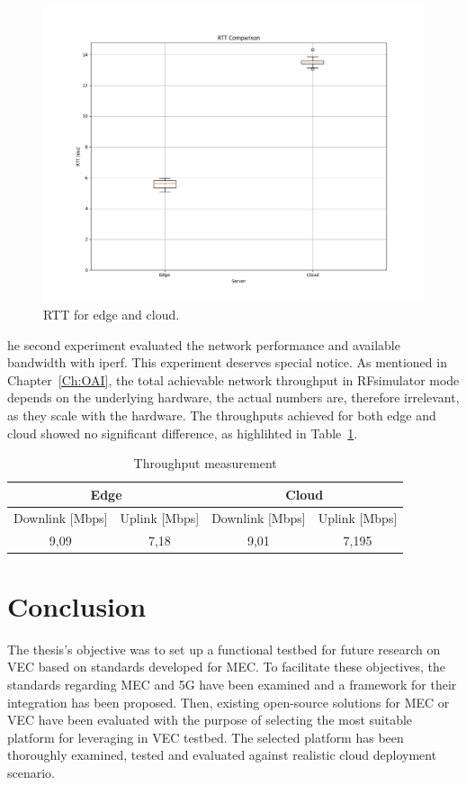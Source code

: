 \documentclass[12pt,a4paper,twoside]{report}
\begin{document}
\begin{figure}[ht]
	\centering
	\captionsetup{labelsep=colon,name=Graph}
	\includegraphics[width=13cm]{./images/RTT_comp_box.png} 
	\caption{RTT for edge and cloud.}
\end{figure}
%
he second experiment evaluated the network performance and available bandwidth with iperf. This experiment deserves special notice. As mentioned in Chapter~\ref{Ch:OAI}, the total achievable network throughput in RFsimulator mode depends on the underlying hardware, the actual numbers are, therefore irrelevant, as they scale with the hardware. The throughputs achieved for both edge and cloud showed no significant difference, as highlihted in Table~\ref{T:throughput}.
\begin{table}[!ht]
    \centering
    \caption{Throughput measurement}
	\label{T:throughput}
    \begin{tabular}{|c|c|c|c|}
    \hline
        \multicolumn{2}{|c|}{Edge} & \multicolumn{2}{c|}{Cloud} \\ \hline
        Downlink [Mbps] & Uplink [Mbps] & Downlink [Mbps] & Uplink [Mbps] \\ \hline
        9,09 & 7,18 & 9,01 & 7,195 \\ \hline
    \end{tabular}
\end{table}
\chapter{Conclusion}
The thesis’s objective was to set up a functional testbed for future research on VEC based on standards developed for MEC. To facilitate these objectives, the standards regarding MEC and 5G have been examined and a framework for their integration has been proposed. Then, existing open-source solutions for MEC or VEC have been evaluated with the purpose of selecting the most suitable platform for leveraging in VEC testbed. The selected platform has been thoroughly examined, tested and evaluated against realistic cloud deployment scenario. 
\end{document}
